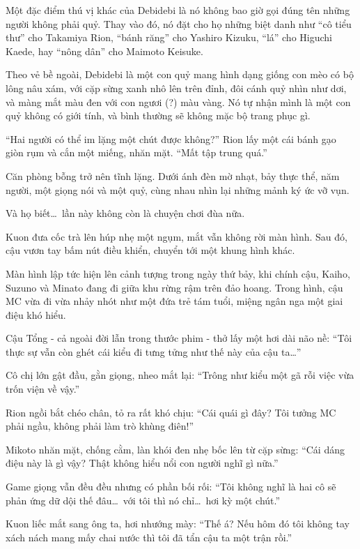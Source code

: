 \documentclass[../main.tex]{subfiles}
\begin{document}
Một đặc điểm thú vị khác của Debidebi là nó không bao giờ gọi đúng tên những người không phải quỷ. Thay vào đó, nó đặt cho họ những biệt danh như ``cô tiểu thư'' cho Takamiya Rion, ``bánh răng'' cho Yashiro Kizuku, ``lá'' cho Higuchi Kaede, hay ``nông dân'' cho Maimoto Keisuke.

Theo vẻ bề ngoài, Debidebi là một con quỷ mang hình dạng giống con mèo có bộ lông nâu xám, với cặp sừng xanh nhô lên trên đỉnh, đôi cánh quỷ nhìn như dơi, và màng mắt màu đen với con ngươi (?) màu vàng. Nó tự nhận mình là một con quỷ không có giới tính, và bình thường sẽ không mặc bộ trang phục gì.

\chrint


``Hai người có thể im lặng một chút được không?'' Rion lấy một cái bánh gạo giòn rụm và cắn một miếng, nhăn mặt. ``Mất tập trung quá.''

Căn phòng bỗng trở nên tĩnh lặng. Dưới ánh đèn mờ nhạt, bảy thực thể, năm người, một giọng nói và một quỷ, cùng nhau nhìn lại những mảnh ký ức vỡ vụn.

Và họ biết\dots\ lần này không còn là chuyện chơi đùa nữa.

Kuon đưa cốc trà lên húp nhẹ một ngụm, mắt vẫn không rời màn hình. Sau đó, cậu vươn tay bấm nút điều khiển, chuyển tới một khung hình khác.

Màn hình lập tức hiện lên cảnh tượng trong ngày thứ bảy, khi chính cậu, Kaiho, Suzuno và Minato đang đi giữa khu rừng rậm trên đảo hoang. Trong hình, cậu MC vừa đi vừa nhảy nhót như một đứa trẻ tám tuổi, miệng ngân nga một giai điệu khó hiểu.

Cậu Tổng - cả ngoài đời lẫn trong thước phim - thở lấy một hơi dài não nề: ``Tôi thực sự vẫn còn ghét cái kiểu đi tưng tửng như thế này của cậu ta\dots''

Cô chị lớn gật đầu, gằn giọng, nheo mắt lại: ``Trông như kiểu một gã rỗi việc vừa trốn viện về vậy.''

Rion ngồi bắt chéo chân, tỏ ra rất khó chịu: ``Cái quái gì đây? Tôi tưởng MC phải ngầu, không phải làm trò khùng điên!''

Mikoto nhăn mặt, chống cằm, làn khói đen nhẹ bốc lên từ cặp sừng: ``Cái dáng điệu này là gì vậy? Thật không hiểu nổi con người nghĩ gì nữa.''

Game giọng vẫn đều đều nhưng có phần bối rối: ``Tôi không nghĩ là hai cô sẽ phản ứng dữ dội thế đâu\dots\ với tôi thì nó chỉ\dots\ hơi kỳ một chút.''

Kuon liếc mắt sang ông ta, hơi nhướng mày: ``Thế á? Nếu hôm đó tôi không tay xách nách mang mấy chai nước thì tôi đã tẩn cậu ta một trận rồi.''
\end{document}
